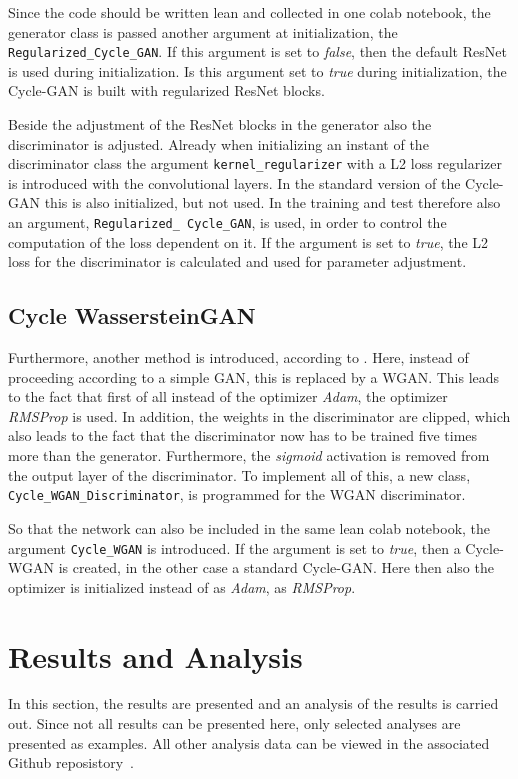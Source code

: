\documentclass[fleqn,10pt]{SelfArx} %
\begin{document}
Since the code should be written lean and collected in one colab notebook, the generator class is passed another argument at initialization, the \texttt{Regularized\_Cycle\_GAN}. If this argument is set to \textit{false}, then the default \ac{ResNet} is used during initialization. Is this argument set to \textit{true} during initialization, the Cycle-\ac{GAN} is built with regularized \ac{ResNet} blocks.

Beside the adjustment of the \ac{ResNet} blocks in the generator also the discriminator is adjusted. Already when initializing an instant of the discriminator class the argument \texttt{kernel\_regularizer} with a L2 loss regularizer is introduced with the convolutional layers. In the standard version of the Cycle-\ac{GAN} this is also initialized, but not used. In the training and test therefore also an argument, \texttt{Regularized\_ Cycle\_GAN}, is used, in order to control the computation of the loss dependent on it. If the argument is set to \textit{true}, the L2 loss for the discriminator is calculated and used for parameter adjustment.


\subsection{Cycle Wasserstein\ac{GAN}}
Furthermore, another method is introduced, according to \cite{wgan-improvement}. Here, instead of proceeding according to a simple \ac{GAN}, this is replaced by a \ac{WGAN}. This leads to the fact that first of all instead of the optimizer \textit{Adam}, the optimizer \textit{\ac{RMSProp}} is used. In addition, the weights in the discriminator are clipped, which also leads to the fact that the discriminator now has to be trained five times more than the generator. Furthermore, the \textit{sigmoid} activation is removed from the output layer of the discriminator. To implement all of this, a new class, \texttt{Cycle\_WGAN\_Discriminator}, is programmed for the \ac{WGAN} discriminator.

So that the network can also be included in the same lean colab notebook, the argument \texttt{Cycle\_WGAN} is introduced. If the argument is set to \textit{true}, then a Cycle-\ac{WGAN} is created, in the other case a standard Cycle-\ac{GAN}. Here then also the optimizer is initialized instead of as \textit{Adam}, as \textit{\ac{RMSProp}}.


\section{Results and Analysis}
In this section, the results are presented and an analysis of the results is carried out. Since not all results can be presented here, only selected analyses are presented as examples. All other analysis data can be viewed in the associated Github reposistory~\cite{ourGithubRepo}.
\end{document}
